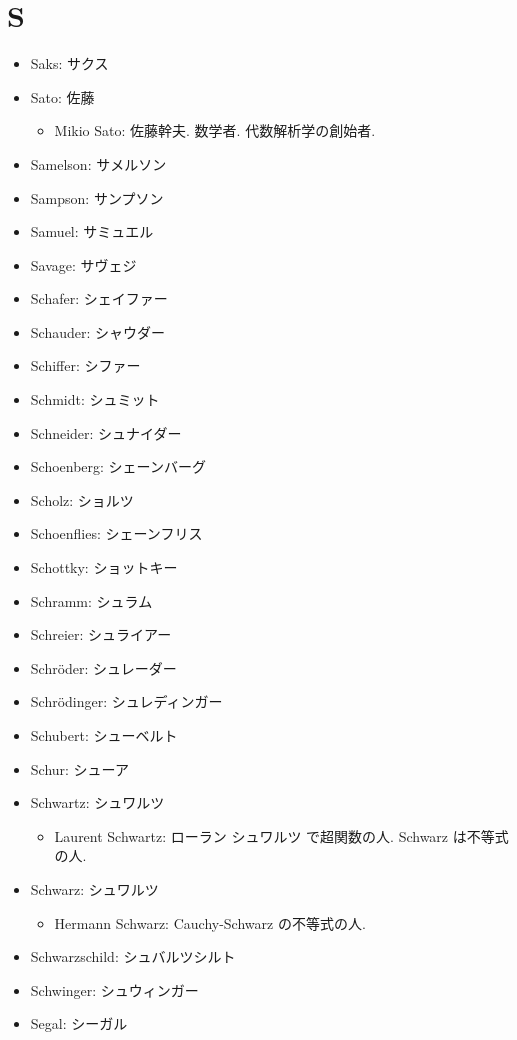 \documentclass[openany, a4paper, oneside]{jsbook}
\begin{document}
\section{S}

\begin{itemize}
\item Saks: サクス
\item Sato: 佐藤
\begin{itemize}
\item Mikio Sato: 佐藤幹夫. 数学者. 代数解析学の創始者.
\end{itemize}
\item Samelson: サメルソン
\item Sampson: サンプソン
\item Samuel: サミュエル
\item Savage: サヴェジ
\item Schafer: シェイファー
\item Schauder: シャウダー
\item Schiffer: シファー
\item Schmidt: シュミット
\item Schneider: シュナイダー
\item Schoenberg: シェーンバーグ
\item Scholz: ショルツ
\item Schoenflies: シェーンフリス
\item Schottky: ショットキー
\item Schramm: シュラム
\item Schreier: シュライアー
\item Schr\"oder: シュレーダー
\item Schr\"odinger: シュレディンガー
\item Schubert: シューベルト
\item Schur: シューア
\item Schwartz: シュワルツ
\begin{itemize}
\item Laurent Schwartz: ローラン シュワルツ で超関数の人. Schwarz は不等式の人.
\end{itemize}
\item Schwarz: シュワルツ
\begin{itemize}
\item Hermann Schwarz: Cauchy-Schwarz の不等式の人.
\end{itemize}
\item Schwarzschild: シュバルツシルト
\item Schwinger: シュウィンガー
\item Segal: シーガル

\end{itemize}
\end{document}
